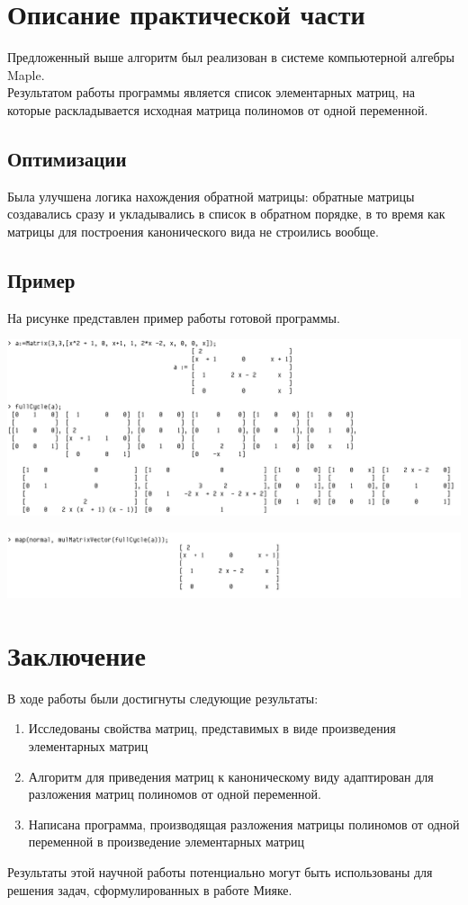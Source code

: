 \documentclass[14pt, a4paper]{extreport}
\begin{document}
\chapter{Описание практической части}
	Предложенный выше алгоритм был реализован в системе компьютерной алгебры Maple.\\
	Результатом работы программы является список элементарных матриц, на которые раскладывается исходная
	матрица полиномов от одной переменной.
	\section{Оптимизации}
	Была улучшена логика нахождения обратной матрицы: обратные матрицы
	создавались сразу и укладывались в список в обратном порядке, в то время как
	матрицы для построения канонического вида не строились вообще.
	\newpage
	\section{Пример}
	На рисунке представлен пример работы готовой программы.\\
	\begin{center}
		\includegraphics[width=\textwidth]{result2_1.png}
	\end{center}
	\begin{center}
		\includegraphics[width=\textwidth]{result2_2.png}
	\end{center}

\chapter{Заключение}
	В ходе работы были достигнуты следующие результаты:
	\begin{enumerate}
		\item Исследованы свойства матриц, представимых в виде произведения элементарных матриц
		\item Алгоритм для приведения матриц к каноническому виду адаптирован для разложения матриц полиномов от одной переменной.
		\item Написана программа, производящая разложения матрицы полиномов от одной переменной в произведение элементарных матриц
	\end{enumerate}
	Результаты этой научной работы потенциально могут быть использованы
	для решения задач, сформулированных в работе \cite{miyake} Мияке.
\end{document}
